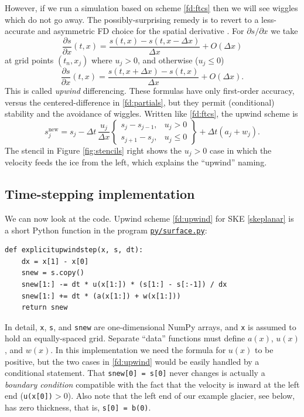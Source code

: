 \documentclass[letterpaper,final,12pt,reqno]{amsart}
\newcommand{\snew}{s^{\text{new}}}
\begin{document}
However, if we run a simulation based on scheme \eqref{fd:ftcs} then we will see wiggles which do not go away.  The possibly-surprising remedy is to revert to a less-accurate and asymmetric FD choice for the spatial derivative \cite{MortonMayers2005}.  For $\partial s/\partial x$ we take
    $$\frac{\partial s}{\partial x}(t,x) = \frac{s(t,x) - s(t,x-\Delta x)}{\Delta x} + O(\Delta x)$$
at grid points $(t_n,x_j)$ where $u_j>0$, and otherwise ($u_j \le 0$)
    $$\frac{\partial s}{\partial x}(t,x) = \frac{s(t,x+\Delta x) - s(t,x)}{\Delta x} + O(\Delta x).$$
This is called \emph{upwind} differencing.  These formulas have only first-order accuracy, versus the centered-difference in \eqref{fd:partials}, but they permit (conditional) stability and the avoidance of wiggles.  Written like \eqref{fd:ftcs}, the upwind scheme is
\begin{equation}
\snew_j = s_j - \Delta t\, \frac{u_j}{\Delta x} \left\{\begin{matrix} s_j-s_{j-1}, & u_j > 0 \\ s_{j+1}-s_j, & u_j \le 0 \end{matrix}\right\} + \Delta t (a_j + w_j).  \label{fd:upwind}
\end{equation}
The stencil in Figure \ref{fig:stencils} right shows the $u_j>0$ case in which the velocity feeds the ice from the left, which explains the ``upwind'' naming.

\subsection*{Time-stepping implementation}  We can now look at the code.  Upwind scheme \eqref{fd:upwind} for SKE \eqref{skeplanar} is a short Python function in the program \href{https://github.com/bueler/mccarthy/blob/master/py/surface.py}{\texttt{py/surface.py}}:

\begin{lstlisting}[language=PythonPlus, xleftmargin=4mm]
def explicitupwindstep(x, s, dt):
    dx = x[1] - x[0]
    snew = s.copy()
    snew[1:] -= dt * u(x[1:]) * (s[1:] - s[:-1]) / dx
    snew[1:] += dt * (a(x[1:]) + w(x[1:]))
    return snew
\end{lstlisting}

\noindent In detail, \texttt{x}, \texttt{s}, and \texttt{snew} are one-dimensional NumPy \cite{Harrisetal2020} arrays, and \texttt{x} is assumed to hold an equally-spaced grid.  Separate ``data'' functions must define $a(x)$, $u(x)$, and $w(x)$.  In this implementation we need the formula for $u(x)$ to be positive, but the two cases in \eqref{fd:upwind} would be easily handled by a conditional statement.  That \texttt{snew[0] = s[0]} never changes is actually a \emph{boundary condition} compatible with the fact that the velocity is inward at the left end (\texttt{u(x[0])}$>0$).  Also note that the left end of our example glacier, see below, has zero thickness, that is, \texttt{s[0] = b(0)}.
\end{document}
